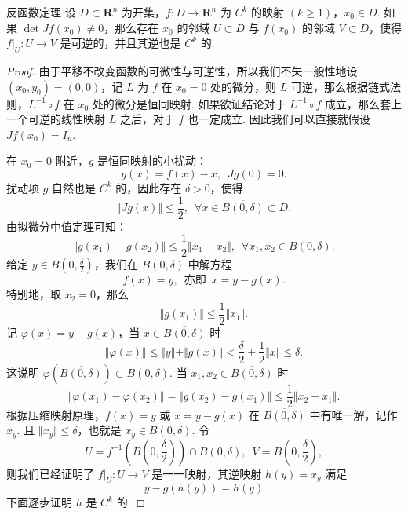 \begin{theorem}{反函数定理}{}
    设 $D\subset \mathbf{R}^n$ 为开集，$f: D\to\mathbf{R}^n$ 为 $C^{k}$ 的映射 $(k\geqslant 1)$，$x_0\in D$. 如果 $\det Jf(x_0)\neq 0$，那么存在 $x_0$ 的邻域 $U\subset D$ 与 $f(x_0)$ 的邻域 $V\subset D$，使得 $\left.f\right|_U: U\to V$ 是可逆的，并且其逆也是 $C^k$ 的.
\end{theorem}

\begin{proof}

    由于平移不改变函数的可微性与可逆性，所以我们不失一般性地设 $(x_0, y_0) = (0, 0)$，记 $L$ 为 $f$ 在 $x_0 = 0$ 处的微分，则 $L$ 可逆，那么根据链式法则，$L^{-1}\circ f$ 在 $x_0$ 处的微分是恒同映射. 如果欲证结论对于 $L^{-1}\circ f$ 成立，那么套上一个可逆的线性映射 $L$ 之后，对于 $f$ 也一定成立. 因此我们可以直接就假设 $Jf(x_0) = I_n$.

    在 $x_0 = 0$ 附近，$g$ 是恒同映射的小扰动：\[g(x) = f(x) - x,\enspace Jg(0) = 0.\]
    扰动项 $g$ 自然也是 $C^k$ 的，因此存在 $\delta > 0$，使得\[\Vert Jg(x)\Vert \leqslant \frac{1}{2},\enspace \forall x\in \overline{B(0, \delta)}\subset D.\]
    由拟微分中值定理可知：\[\Vert g(x_1) - g(x_2)\Vert \leqslant \frac{1}{2}\Vert x_1 - x_2\Vert,\enspace \forall x_1, x_2\in \overline{B(0, \delta)}.\]
    给定 $y\in B(0, \frac{\delta}{2})$，我们在 $B(0, \delta)$ 中解方程 \[f(x) = y,\enspace\text{亦即}\enspace x = y - g(x).\]
    特别地，取 $x_2 = 0$，那么 \[\Vert g(x_1) \Vert \leqslant \frac{1}{2}\Vert x_1\Vert.\]
    记 $\varphi(x) = y - g(x)$，当 $x\in \overline{B(0, \delta)}$ 时\[\Vert \varphi(x)\Vert \leqslant \Vert y\Vert +\Vert g(x)\Vert < \frac{\delta}{2} + \frac{1}{2}\Vert x\Vert \leqslant \delta.\]
    这说明 $\varphi(\overline{B(0, \delta)})\subset B(0, \delta)$. 当 $x_1, x_2\in \overline{B(0, \delta)}$ 时\[\Vert \varphi(x_1) - \varphi(x_2) \Vert = \Vert g(x_2) - g(x_1)\Vert \leqslant \frac{1}{2}\Vert x_2 - x_1\Vert.\]
    根据压缩映射原理，$f(x) = y$ 或 $x = y - g(x)$ 在 $\overline{B(0, \delta)}$ 中有唯一解，记作 $x_y$. 且 $\Vert x_y\Vert \leqslant \delta$，也就是 $x_y\in B(0, \delta)$. 令\[U = f^{-1}(B(0, \frac{\delta}{2}))\cap B(0, \delta),\enspace V = B(0, \frac{\delta}{2}),\]
    则我们已经证明了 $\left.f\right|_U: U\to V$ 是一一映射，其逆映射 $h(y) = x_y$ 满足 \[y - g(h(y)) = h(y)\]
    下面逐步证明 $h$ 是 $C^k$ 的.


\end{proof}
